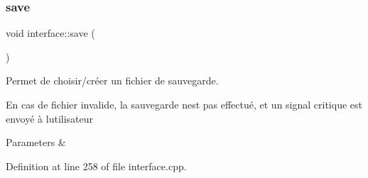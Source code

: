 \subsubsection{\texorpdfstring{save}{save}}
{\footnotesize\ttfamily void interface\+::save (\begin{DoxyParamCaption}{ }\end{DoxyParamCaption})\hspace{0.3cm}{\ttfamily [slot]}}



Permet de choisir/créer un fichier de sauvegarde. 

En cas de fichier invalide, la sauvegarde n\textquotesingle{}est pas effectué, et un signal critique est envoyé à l\textquotesingle{}utilisateur 
\begin{DoxyParams}{Parameters}
{\em } & \\
\hline
\end{DoxyParams}


Definition at line 258 of file interface.\+cpp.


